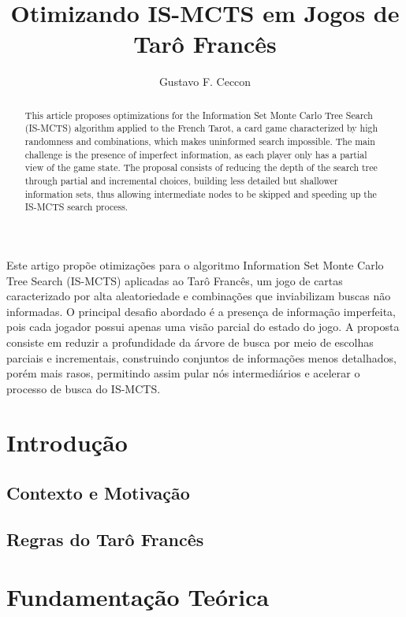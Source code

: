\documentclass[12pt]{article}
\title{Otimizando IS-MCTS em Jogos de Tarô Francês}
\author{Gustavo F. Ceccon\inst{1} }
\begin{document}
 

\maketitle

\begin{abstract}
This article proposes optimizations for the Information Set Monte Carlo Tree Search (IS-MCTS) algorithm applied to the French Tarot, a card game characterized by high randomness and combinations, which makes uninformed search impossible. The main challenge is the presence of imperfect information, as each player only has a partial view of the game state. The proposal consists of reducing the depth of the search tree through partial and incremental choices, building less detailed but shallower information sets, thus allowing intermediate nodes to be skipped and speeding up the IS-MCTS search process.\end{abstract}
     
\begin{resumo} 
Este artigo propõe otimizações para o algoritmo Information Set Monte Carlo Tree Search (IS-MCTS) aplicadas ao Tarô Francês, um jogo de cartas caracterizado por alta aleatoriedade e combinações que inviabilizam buscas não informadas. O principal desafio abordado é a presença de informação imperfeita, pois cada jogador possui apenas uma visão parcial do estado do jogo. A proposta consiste em reduzir a profundidade da árvore de busca por meio de escolhas parciais e incrementais, construindo conjuntos de informações menos detalhados, porém mais rasos, permitindo assim pular nós intermediários e acelerar o processo de busca do IS-MCTS.
\end{resumo}


\section{Introdução}

\subsection{Contexto e Motivação}

\subsection{Regras do Tarô Francês}

\section{Fundamentação Teórica}
\end{document}

